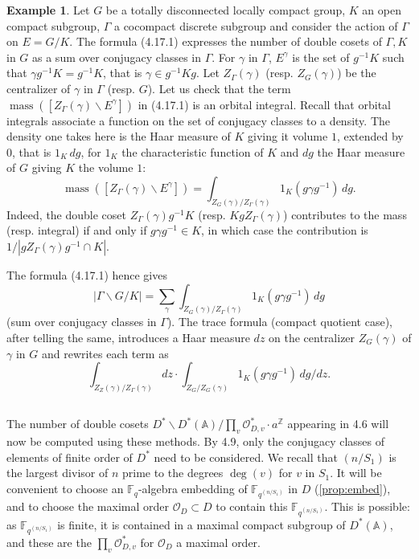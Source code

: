 \documentclass[11pt,a4paper]{article}
\theoremstyle{plain}
\theoremstyle{definition}
\newtheorem{example}[theorem]{Example}
\DeclareMathOperator{\mass}{mass}
\newcommand{\Fq}{\mathbb{F}_q}
\newcommand{\F}{\mathbb{F}}
\newcommand{\Z}{\mathbb{Z}}
\begin{document}
\begin{example}
Let $G$ be a totally disconnected locally compact group, $K$ an open compact subgroup, $\Gamma$ a cocompact discrete subgroup and consider the action of $\Gamma$ on $E = G/K$. The formula (4.17.1) expresses the number of double cosets of $\Gamma, K$ in $G$ as a sum over conjugacy classes in $\Gamma$. For $\gamma$ in $\Gamma$, $E^\gamma$ is the set of $g^{-1}K$ such that $\gamma g^{-1}K = g^{-1}K$, that is $\gamma \in g^{-1}Kg$. Let $Z_\Gamma(\gamma)$ (resp. $Z_G(\gamma)$) be the centralizer of $\gamma$ in $\Gamma$ (resp. $G$). Let us check that the term $\mass([Z_\Gamma(\gamma) \backslash E^\gamma])$ in (4.17.1) is an orbital integral. Recall that orbital integrals associate a function on the set of conjugacy classes to a density. The density one takes here is the Haar measure of $K$ giving it volume $1$, extended by $0$, that is $1_K \,dg$, for $1_K$ the characteristic function of $K$ and $dg$ the Haar measure of $G$ giving $K$ the volume $1$:
\begin{equation}
\mass([Z_\Gamma(\gamma) \backslash E^\gamma]) = \int_{Z_G(\gamma)/Z_\Gamma(\gamma)} 1_K(g \gamma g^{-1}) \, dg. \tag{4.18.1}
\end{equation}
Indeed, the double coset $Z_\Gamma(\gamma) g^{-1} K$ (resp. $K g Z_\Gamma(\gamma)$) contributes to the mass (resp. integral) if and only if $g \gamma g^{-1} \in K$, in which case the contribution is $1/|g Z_\Gamma(\gamma) g^{-1} \cap K|$.

The formula (4.17.1) hence gives
\begin{equation}
|\Gamma \backslash G/K| = \sum_{\gamma} \int_{Z_G(\gamma)/Z_\Gamma(\gamma)} 1_K(g \gamma g^{-1}) \, dg \tag{4.18.2}
\end{equation}
(sum over conjugacy classes in $\Gamma$). The trace formula (compact quotient case), after telling the same, introduces a Haar measure $dz$ on the centralizer $Z_G(\gamma)$ of $\gamma$ in $G$ and rewrites each term as
\[
\int_{Z_Z(\gamma)/Z_\Gamma(\gamma)} dz \cdot \int_{Z_G/Z_G(\gamma)} 1_K(g \gamma g^{-1}) \, dg/dz.
\]
\end{example}

\subsection{}

The number of double cosets $D^* \backslash D^*(\mathbb{A}) / \prod_v \mathcal{O}_{D,v}^* \cdot a^{\Z}$ appearing in 4.6 will now be computed using these methods. By 4.9, only the conjugacy classes of elements of finite order of $D^*$ need to be considered. We recall that $(n/S_1)$ is the largest divisor of $n$ prime to the degrees $\deg(v)$ for $v$ in $S_1$. It will be convenient to choose an $\Fq$-algebra embedding of $\F_{q^{(n/S_1)}}$ in $D$ (\ref{prop:embed}), and to choose the maximal order $\mathcal{O}_D \subset D$ to contain this $\F_{q^{(n/S_1)}}$. This is possible: as $\F_{q^{(n/S_1)}}$ is finite, it is contained in a maximal compact subgroup of $D^*(\mathbb{A})$, and these are the $\prod_v \mathcal{O}_{D,v}^*$ for $\mathcal{O}_D$ a maximal order.
\end{document}
